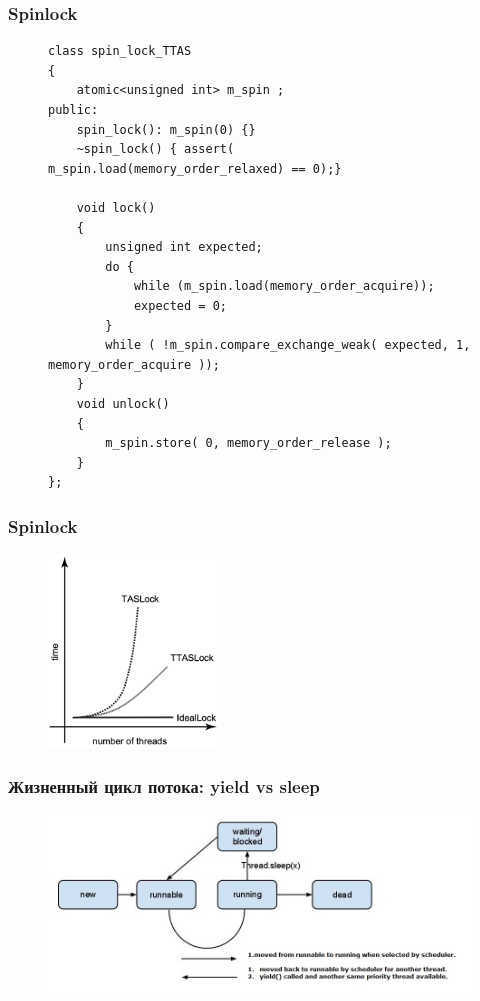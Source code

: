 \documentclass[aspectratio=169, pdf, 8pt, unicode]{beamer}
\begin{document}
\begin{frame}[fragile]
\frametitle{Spinlock}
\begin{figure}[H]
\centering
\begin{minipage}{0.8\textwidth}
\begin{verbatim}
class spin_lock_TTAS
{
    atomic<unsigned int> m_spin ;
public:
    spin_lock(): m_spin(0) {}
    ~spin_lock() { assert( m_spin.load(memory_order_relaxed) == 0);}

    void lock()
    {
        unsigned int expected;
        do {
            while (m_spin.load(memory_order_acquire));
            expected = 0;
        }
        while ( !m_spin.compare_exchange_weak( expected, 1, memory_order_acquire ));
    }
    void unlock()
    {
        m_spin.store( 0, memory_order_release );
    }
};
\end{verbatim}
\end{minipage}
\end{figure}
\end{frame}

\begin{frame}[fragile]
\frametitle{Spinlock}
\begin{figure}[H]
\centering
\includegraphics[width=0.4\textwidth]{fig/tas_vs_ttas.png}
\end{figure}
\end{frame}

\begin{frame}[fragile]
\frametitle{Жизненный цикл потока: yield vs sleep}
\begin{figure}[H]
\centering
\includegraphics[width=1.0\textwidth]{fig/yield_vs_sleep.jpg}
\end{figure}
\end{frame}
\end{document}
